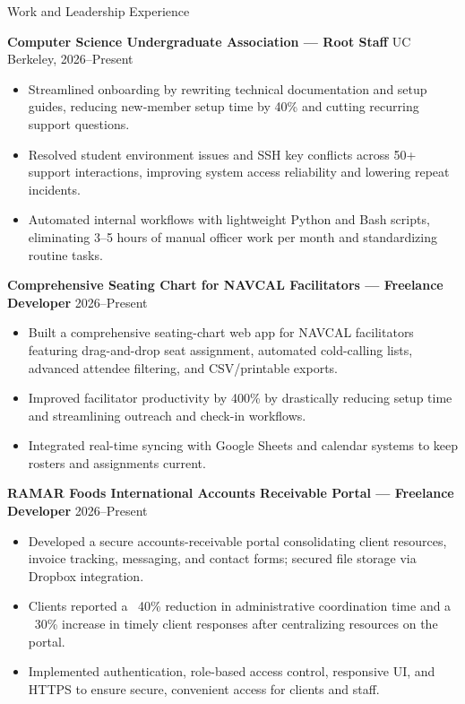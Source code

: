 \documentclass{resume}
\begin{document}
\begin{rSection}{Work and Leadership Experience}

\textbf{Computer Science Undergraduate Association — Root Staff} \hfill UC Berkeley, 2026–Present
\begin{itemize}
  \item Streamlined onboarding by rewriting technical documentation and setup guides, reducing new‑member setup time by 40\% and cutting recurring support questions.
  \item Resolved student environment issues and SSH key conflicts across 50+ support interactions, improving system access reliability and lowering repeat incidents.
  \item Automated internal workflows with lightweight Python and Bash scripts, eliminating 3--5 hours of manual officer work per month and standardizing routine tasks.
\end{itemize}

\textbf{Comprehensive Seating Chart for NAVCAL Facilitators — Freelance Developer} \hfill 2026–Present
\begin{itemize}
  \item Built a comprehensive seating-chart web app for NAVCAL facilitators featuring drag-and-drop seat assignment, automated cold-calling lists, advanced attendee filtering, and CSV/printable exports.
  \item Improved facilitator productivity by 400\% by drastically reducing setup time and streamlining outreach and check-in workflows.
  \item Integrated real-time syncing with Google Sheets and calendar systems to keep rosters and assignments current.
\end{itemize}

\textbf{RAMAR Foods International Accounts Receivable Portal — Freelance Developer} \hfill 2026–Present
\begin{itemize}
  \item Developed a secure accounts-receivable portal consolidating client resources, invoice tracking, messaging, and contact forms; secured file storage via Dropbox integration.
  \item Clients reported a ~40\% reduction in administrative coordination time and a ~30\% increase in timely client responses after centralizing resources on the portal.
  \item Implemented authentication, role-based access control, responsive UI, and HTTPS to ensure secure, convenient access for clients and staff.
\end{itemize}


\end{rSection}
\end{document}
